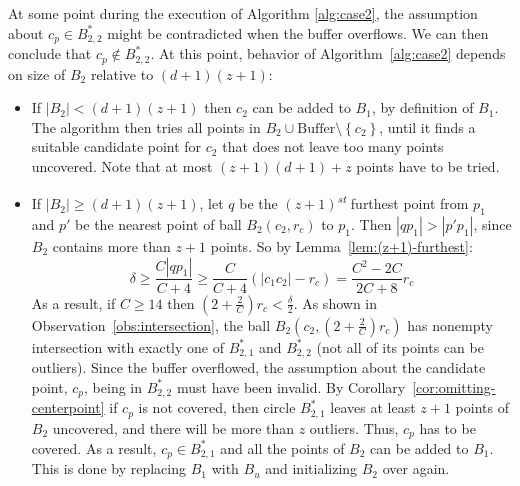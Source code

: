 \documentclass[envcountsame]{cls/cccg15}
\newcommand{\st}{\textsuperscript{\textit{st}} }
\newcommand{\set}[1]{\left\{ #1 \right\}}
\newcommand{\card}[1]{\left|{#1}\right|}
\newcommand{\gee}{\geqslant}
\renewcommand{\geq}{\gee}
\renewcommand{\ge}{\gee}
\begin{document}
At some point during the execution of Algorithm \ref{alg:case2}, the assumption about $c_p \in B_{2,2}^*$ might be contradicted when the buffer overflows. We can then conclude that
 $c_p \notin B_{2,2}^*$.
At this point, behavior of Algorithm~\ref{alg:case2} depends on size of $B_2$ relative to $(d+1)(z+1)$:
\begin{itemize}
\item If $\card{B_2} < (d+1)(z+1)$ then $c_2$ can be added to $B_1$, by definition of $B_1$.
The algorithm then tries all points in $B_2 \cup \mbox{Buffer} \setminus \set{c_2}$, until it finds a suitable candidate point for $c_2$ that does not leave too many points uncovered. Note that at most $(z+1)(d+1) + z$ points have to be tried.
\item If $\card{B_2} \ge (d+1)(z+1)$, let $q$ be the $(z+1)$\st furthest point from $p_1$ and $p'$ be the nearest point of ball $B_2(c_2, r_c)$ to $p_1$. Then $\card{qp_1} > \card{p'p_1}$, since $B_2$ contains more than $z+1$ points. So by Lemma~\ref{lem:(z+1)-furthest}:
\[
\delta \ge \frac{C \card{qp_1}}{C+4} \ge \frac{C}{C+4} (\card{c_1c_2} - r_c) = \frac{C^2 - 2C}{2C + 8} r_c
\]
As a result, if $C \geq 14$ then $(2 + \frac{2}{C}) r_c < \frac{\delta}{2}$. As shown in Observation~\ref{obs:intersection}, the ball $B_2(c_2, (2 + \frac{2}{C}) r_c)$ has nonempty intersection with exactly one of $B_{2, 1}^*$ and $B_{2, 2}^*$ (not all of its points can be outliers). Since the buffer overflowed, the assumption about the candidate point, $c_p$, being in $B_{2,2}^*$ must have been invalid. By Corollary~\ref{cor:omitting-centerpoint} if $c_p$ is not covered, then circle $B_{2,1}^*$ leaves at least $z+1$ points of $B_2$ uncovered, and there will be more than $z$ outliers. Thus, $c_p$ has to be covered. As a result, $c_p \in B_{2, 1}^*$ and all the points of $B_2$ can be added to $B_1$. This is done by replacing $B_1$ with $B_u$ and initializing $B_2$ over again.
\end{itemize}
\end{document}
